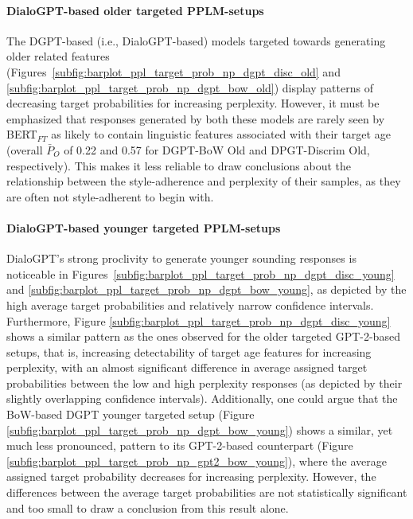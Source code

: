 \paragraph{DialoGPT-based older targeted PPLM-setups} The DGPT-based (i.e., DialoGPT-based) models targeted towards generating older related features (Figures~\ref{subfig:barplot_ppl_target_prob_np_dgpt_disc_old} and \ref{subfig:barplot_ppl_target_prob_np_dgpt_bow_old}) display patterns of decreasing target probabilities for increasing perplexity. However, it must be emphasized that responses generated by both these models are rarely seen by BERT$_{FT}$ as likely to contain linguistic features associated with their target age (overall $\bar{P}_O$ of 0.22 and 0.57 for DGPT-BoW Old and DPGT-Discrim Old, respectively). This makes it less reliable to draw conclusions about the relationship between the style-adherence and perplexity of their samples, as they are often not style-adherent to begin with.

\paragraph{DialoGPT-based younger targeted PPLM-setups} DialoGPT's strong proclivity to generate younger sounding responses is noticeable in Figures~\ref{subfig:barplot_ppl_target_prob_np_dgpt_disc_young} and \ref{subfig:barplot_ppl_target_prob_np_dgpt_bow_young}, as depicted by the high average target probabilities and relatively narrow confidence intervals. Furthermore, Figure \ref{subfig:barplot_ppl_target_prob_np_dgpt_disc_young} shows a similar pattern as the ones observed for the older targeted GPT-2-based setups, that is, increasing detectability of target age features for increasing perplexity, with an almost significant difference in average assigned target probabilities between the low and high perplexity responses (as depicted by their slightly overlapping confidence intervals). 
Additionally, one could argue that the BoW-based DGPT younger targeted setup (Figure \ref{subfig:barplot_ppl_target_prob_np_dgpt_bow_young}) shows a similar, yet much less pronounced, pattern to its GPT-2-based counterpart (Figure \ref{subfig:barplot_ppl_target_prob_np_gpt2_bow_young}), where the average assigned target probability decreases for increasing perplexity. However, the differences between the average target probabilities are not statistically significant and too small to draw a conclusion from this result alone.


